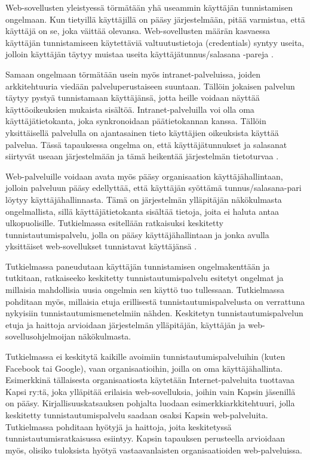 Web-sovellusten yleistyessä törmätään yhä useammin käyttäjän tunnistamisen ongelmaan. Kun tietyillä käyttäjillä on pääsy järjestelmään, pitää varmistua, että käyttäjä on se, joka väittää olevansa. Web-sovellusten määrän kasvaessa käyttäjän tunnistamiseen käytettäviä valtuutustietoja (credentials) syntyy useita, jolloin käyttäjän täytyy muistaa useita käyttäjätunnus/salasana -pareja \cite{billion_keys}.

Samaan ongelmaan törmätään usein myös intranet-palveluissa, joiden arkkitehtuuria viedään palveluperustaiseen suuntaan. Tällöin jokaisen palvelun täytyy pystyä tunnistamaan käyttäjänsä, jotta heille voidaan näyttää käyttöoikeuksien mukaista sisältöä. Intranet-palveluilla voi olla oma käyttäjätietokanta, joka synkronoidaan päätietokannan kanssa. Tällöin yksittäisellä palvelulla on ajantasainen tieto käyttäjien oikeuksista käyttää palvelua. Tässä tapauksessa ongelma on, että käyttäjätunnukset ja salasanat siirtyvät useaan järjestelmään ja tämä heikentää järjestelmän tietoturvaa \cite{nisti}.

Web-palveluille voidaan avata myös pääsy organisaation käyttäjähallintaan, jolloin palveluun pääsy edellyttää, että käyttäjän syöttämä tunnus/salasana-pari löytyy käyttäjähallinnasta. Tämä on järjestelmän ylläpitäjän näkökulmasta ongelmallista, sillä käyttäjätietokanta sisältää tietoja, joita ei haluta antaa ulkopuolisille. Tutkielmassa esitellään ratkaisuksi keskitetty tunnistautumispalvelu, jolla on pääsy käyttäjähallintaan ja jonka avulla yksittäiset web-sovellukset tunnistavat käyttäjänsä \cite{nisti}.

Tutkielmassa paneudutaan käyttäjän tunnistamisen ongelmakenttään ja tutkitaan, ratkaiseeko keskitetty tunnistautumispalvelu esitetyt ongelmat ja millaisia mahdollisia uusia ongelmia sen käyttö tuo tullessaan. Tutkielmassa pohditaan myös, millaisia etuja erillisestä tunnistautumispalvelusta on verrattuna nykyisiin tunnistautumismenetelmiin nähden. Keskitetyn tunnistautumispalvelun etuja ja haittoja arvioidaan järjestelmän ylläpitäjän, käyttäjän ja web-sovellusohjelmoijan näkökulmasta.

Tutkielmassa ei keskitytä kaikille avoimiin tunnistautumispalveluihin (kuten Facebook tai Google), vaan organisaatioihin, joilla on oma käyttäjähallinta. Esimerkkinä tällaisesta organisaatiosta käytetään Internet-palveluita tuottavaa Kapsi ry:tä, joka ylläpitää erilaisia web-sovelluksia, joihin vain Kapsin jäsenillä on pääsy. Kirjallisuuskatsauksen pohjalta luodaan esimerkkiarkkitehtuuri, jolla keskitetty tunnistautumispalvelu saadaan osaksi Kapsin web-palveluita. Tutkielmassa pohditaan hyötyjä ja haittoja, joita keskitetyssä tunnistautumisratkaisussa esiintyy. Kapsin tapauksen perusteella arvioidaan myös, olisiko tuloksista hyötyä vastaavanlaisten organisaatioiden web-palveluissa.

